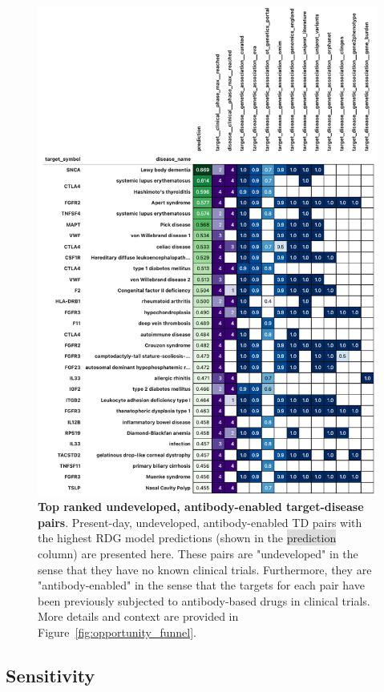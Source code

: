 \documentclass{article}
\begin{document}
\begin{figure}[H]
  \centering
  \captionsetup{width=.9\linewidth}
  \includegraphics[width=.9\textwidth]{top_opportunity_predictions.png}
  \caption{
    \textbf{Top ranked undeveloped, antibody-enabled target-disease pairs}. 
    Present-day, undeveloped, antibody-enabled TD pairs with the highest RDG model predictions (shown in the \colorbox{Gainsboro}{prediction} column) are presented here. These pairs are "undeveloped" in the sense that they have no known clinical trials. Furthermore, they are "antibody-enabled" in the sense that the targets for each pair have been previously subjected to antibody-based drugs in clinical trials. More details and context are provided in Figure~\ref{fig:opportunity_funnel}.
  }
  \label{fig:top_opportunity_predictions}
\end{figure}

\pagebreak

\subsection{Sensitivity}
\label{sec:sensitivity}
\end{document}
